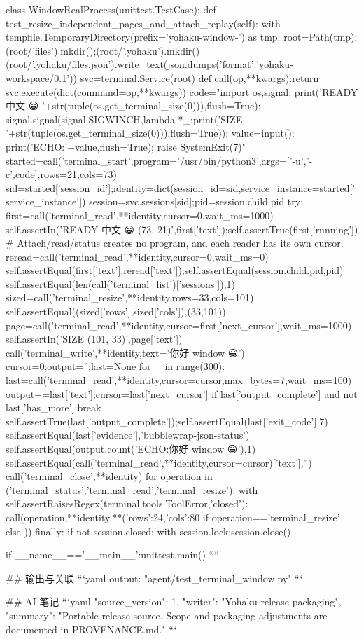 class WindowRealProcess(unittest.TestCase):
    def test_resize_independent_pages_and_attach_replay(self):
        with tempfile.TemporaryDirectory(prefix='yohaku-window-') as tmp:
            root=Path(tmp);(root/'files').mkdir();(root/'.yohaku').mkdir()
            (root/'.yohaku/files.json').write_text(json.dumps({'format':'yohaku-workspace/0.1'}))
            svc=terminal.Service(root)
            def call(op,**kwargs):return svc.execute(dict(command=op,**kwargs))
            code="import os,signal; print('READY 中文 😀 '+str(tuple(os.get_terminal_size(0))),flush=True); signal.signal(signal.SIGWINCH,lambda *_:print('SIZE '+str(tuple(os.get_terminal_size(0))),flush=True)); value=input(); print('ECHO:'+value,flush=True); raise SystemExit(7)"
            started=call('terminal_start',program='/usr/bin/python3',args=['-u','-c',code],rows=21,cols=73)
            sid=started['session_id'];identity=dict(session_id=sid,service_instance=started['service_instance'])
            session=svc.sessions[sid];pid=session.child.pid
            try:
                first=call('terminal_read',**identity,cursor=0,wait_ms=1000)
                self.assertIn('READY 中文 😀 (73, 21)',first['text']);self.assertTrue(first['running'])
                # Attach/read/status creates no program, and each reader has its own cursor.
                reread=call('terminal_read',**identity,cursor=0,wait_ms=0)
                self.assertEqual(first['text'],reread['text']);self.assertEqual(session.child.pid,pid)
                self.assertEqual(len(call('terminal_list')['sessions']),1)
                sized=call('terminal_resize',**identity,rows=33,cols=101)
                self.assertEqual((sized['rows'],sized['cols']),(33,101))
                page=call('terminal_read',**identity,cursor=first['next_cursor'],wait_ms=1000)
                self.assertIn('SIZE (101, 33)',page['text'])
                call('terminal_write',**identity,text='你好 window 😀\n')
                cursor=0;output='';last=None
                for _ in range(300):
                    last=call('terminal_read',**identity,cursor=cursor,max_bytes=7,wait_ms=100)
                    output+=last['text'];cursor=last['next_cursor']
                    if last['output_complete'] and not last['has_more']:break
                self.assertTrue(last['output_complete']);self.assertEqual(last['exit_code'],7)
                self.assertEqual(last['evidence'],'bubblewrap-json-status')
                self.assertEqual(output.count('ECHO:你好 window 😀'),1)
                self.assertEqual(call('terminal_read',**identity,cursor=cursor)['text'],'')
                call('terminal_close',**identity)
                for operation in ('terminal_status','terminal_read','terminal_resize'):
                    with self.assertRaisesRegex(terminal.tools.ToolError,'closed'):
                        call(operation,**identity,**({'rows':24,'cols':80} if operation=='terminal_resize' else {}))
            finally:
                if not session.closed:
                    with session.lock:session.close()

if __name__=='__main__':unittest.main()
````

## 输出与关联
```yaml
output: "agent/test_terminal_window.py"
```

## AI 笔记
```yaml
{"source_version": 1, "writer": "Yohaku release packaging", "summary": "Portable release source. Scope and packaging adjustments are documented in PROVENANCE.md."}
```
